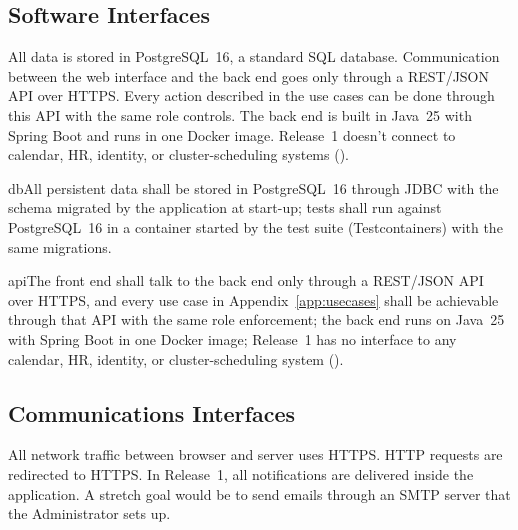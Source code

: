 \subsection{Software Interfaces}

All data is stored in PostgreSQL~16, a standard SQL database. Communication between the web interface and the back end goes only through a REST/JSON API over HTTPS. Every action described in the use cases can be done through this API with the same role controls. The back end is built in Java~25 with Spring Boot and runs in one Docker image. Release~1 doesn't connect to calendar, HR, identity, or cluster-scheduling systems ().

\si{db}{All persistent data shall be stored in PostgreSQL~16 through JDBC with the schema migrated by the application at start-up; tests shall run against PostgreSQL~16 in a container started by the test suite (Testcontainers) with the same migrations.}

\si{api}{The front end shall talk to the back end only through a REST/JSON API over HTTPS, and every use case in Appendix~\ref{app:usecases} shall be achievable through that API with the same role enforcement; the back end runs on Java~25 with Spring Boot in one Docker image; Release~1 has no interface to any calendar, HR, identity, or cluster-scheduling system ().}

\subsection{Communications Interfaces}

All network traffic between browser and server uses HTTPS. HTTP requests are redirected to HTTPS. In Release~1, all notifications are delivered inside the application. A stretch goal would be to send emails through an SMTP server that the Administrator sets up.


